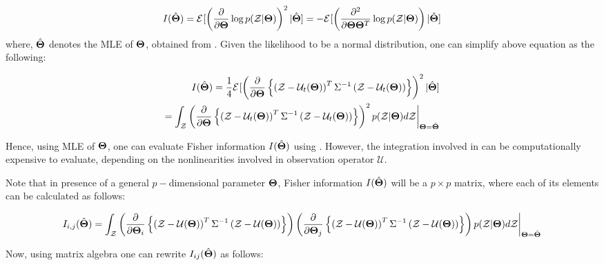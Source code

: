 \documentclass[]{article}
\begin{document}
\begin{equation}\label{fisher0}
I(\hat{\boldsymbol{\Theta}}) = \mathcal{E}^{}[\left(\frac{\partial}{\partial \boldsymbol{\Theta}}\log p(\mathcal{Z}|\boldsymbol{\Theta})\right)^2|\hat{\boldsymbol{\Theta}}]
= -\mathcal{E}^{}[\left(\frac{\partial^2}{\partial \boldsymbol{\Theta}\boldsymbol{\Theta}^T}\log p(\mathcal{Z}|\boldsymbol{\Theta})\right)|\hat{\boldsymbol{\Theta}}]
\end{equation}
where, $\hat{\boldsymbol{\Theta}}$ denotes the MLE of $\boldsymbol{\Theta}$, obtained from . Given the likelihood to be a normal distribution, one can simplify above equation as the following:

\begin{eqnarray}\label{fisher}
I(\hat{\boldsymbol{\Theta}}) = \frac{1}{4}\mathcal{E}^{}[\left(\frac{\partial}{\partial \boldsymbol{\Theta}}\left\{ \left(\mathcal{Z}-{\mathcal{U}}_t(\boldsymbol{\Theta})\right)^T\Sigma^{-1}\left(\mathcal{Z}-{\mathcal{U}}_t(\boldsymbol{\Theta})\right)\right\} \right)^2|\hat{\boldsymbol{\Theta}}]\nonumber\\
= \int_{\mathcal{Z}} \left(\frac{\partial}{\partial \boldsymbol{\Theta}}\left\{ \left(\mathcal{Z}-{\mathcal{U}}_t(\boldsymbol{\Theta})\right)^T\Sigma^{-1}\left(\mathcal{Z}-{\mathcal{U}}_t(\boldsymbol{\Theta})\right)\right\} \right)^2 p(\mathcal{Z}|\boldsymbol{\Theta})d\mathcal{Z}\bigg|_{\boldsymbol{\Theta}=\hat{\boldsymbol{\Theta}}}
\end{eqnarray}

Hence, using MLE of $\boldsymbol{\Theta}$, one can evaluate Fisher information $I(\hat{\boldsymbol{\Theta}})$ using . However, the integration involved in  can be computationally expensive to evaluate, depending on the nonlinearities involved in observation operator $\mathcal{U}$.

Note that in presence of a general $p-$dimensional parameter $\boldsymbol{\Theta}$, Fisher information $I(\hat{\boldsymbol{\Theta}})$ will be a $p\times p$ matrix, where each of its elements can be calculated as follows:


\begin{eqnarray}\label{fisher_matrix}
I_{i,j}(\hat{\boldsymbol{\Theta}})=\int_{\mathcal{Z}} \left(\frac{\partial}{\partial \boldsymbol{\Theta}_i}\left\{ \left(\mathcal{Z}-{\mathcal{U}}(\boldsymbol{\Theta})\right)^T\Sigma^{-1}\left(\mathcal{Z}-{\mathcal{U}}(\boldsymbol{\Theta})\right)\right\}\right)
\left(\frac{\partial}{\partial \boldsymbol{\Theta}_j}\left\{ \left(\mathcal{Z}-{\mathcal{U}}(\boldsymbol{\Theta})\right)^T\Sigma^{-1}\left(\mathcal{Z}-{\mathcal{U}}(\boldsymbol{\Theta})\right)\right\}\right) p(\mathcal{Z}|\boldsymbol{\Theta})d\mathcal{Z}\bigg|_{\boldsymbol{\Theta}=\hat{\boldsymbol{\Theta}}}
\end{eqnarray}

Now, using matrix algebra one can rewrite $I_{ij}(\hat{\boldsymbol{\Theta}})$ as follows:
\end{document}
